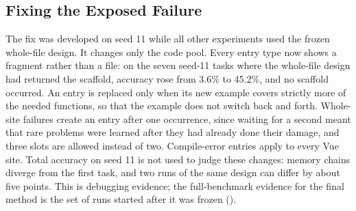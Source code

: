 \subsection{Fixing the Exposed Failure}
\label{sec:fix}
The fix was developed on seed 11 while all other experiments used the frozen whole-file design. It changes only the code pool. Every entry type now shows a fragment rather than a file: on the seven seed-11 tasks where the whole-file design had returned the scaffold, accuracy rose from 3.6\% to 45.2\%, and no scaffold occurred. An entry is replaced only when its new example covers strictly more of the needed functions, so that the example does not switch back and forth. Whole-site failures create an entry after one occurrence, since waiting for a second meant that rare problems were learned after they had already done their damage, and three slots are allowed instead of two. Compile-error entries apply to every Vue site. Total accuracy on seed 11 is not used to judge these changes: memory chains diverge from the first task, and two runs of the same design can differ by about five points. This is debugging evidence; the full-benchmark evidence for the final method is the set of runs started after it was frozen ().
